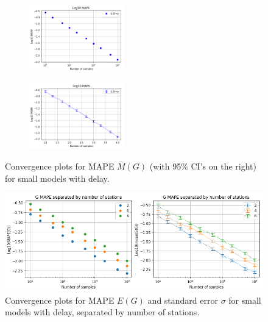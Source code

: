 \begin{figure}[!htb]
\begin{center}
\begin{subfigure}
    \centering
    \includegraphics[width=0.45\textwidth]{Chap6_EvaluationAndAnalysis/images/OverallConvergence_Delay.png}
\end{subfigure}
\begin{subfigure}
    \centering
    \includegraphics[width=0.45\textwidth]{Chap6_EvaluationAndAnalysis/images/OverallConvergenceSigma_Delay.png}
\end{subfigure}
\caption{ Convergence plots for MAPE \(\bar{M}(G)\) (with 95\% CI's on the right) for small models with delay.}
\label{fig:OverallConvergence_Delay}
\end{center}
\end{figure}

\begin{figure}[!htb]
\begin{center}
\includegraphics[width=.9\textwidth]{Chap6_EvaluationAndAnalysis/images/ConvergenceNumberOfStations_SM_Delay.png}
\caption{Convergence plots for MAPE \(E(G)\) and standard error \(\sigma\) for small models with delay, separated by number of stations.}
\label{fig:ConvergenceNumberOfStations_SM_Delay}
\end{center}
\end{figure}

